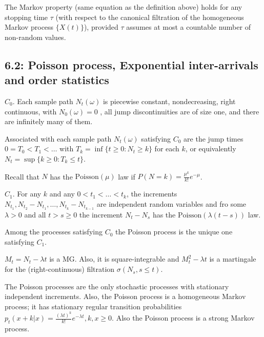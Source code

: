 \begin{proposition*} 
The Markov property (same equation as the definition above) holds for any
stopping time $\tau$ (with respect to the canonical filtration of the
homogeneous Markov process $\{X(t)\}$), provided $\tau$ assumes at most a
countable number of non-random values.
\end{proposition*} 







\subsection*{6.2: Poisson process, Exponential inter-arrivals and order statistics}

\begin{condition*}
$\boxed{C_0}$. Each sample path $N_t(\omega)$ is piecewise constant, nondecreasing, right continuous, with $N_0(\omega)=0$ , all jump discontinuities are of size one, and there are infinitely many of them.
\end{condition*}

Associated with each sample path $N_t(\omega)$ satisfying $\boxed{C_0}$ are the jump times $0=T_0<T_1<\dots$ with $T_k = \inf\{t \geq 0:N_t\geq k\}$ for each $k$, or equivalently $N_t = \sup\{k \geq 0 : T_k \leq t\}$. 

Recall that $N$ has the $\text{Poisson}(\mu)$ law if $P(N=k)=\frac{\mu^k}{k!}e^{-\mu}$.

\begin{condition*}
$\boxed{C_1}$. For any $k$ and any $0<t_1<\dots<t_k$, the increments $N_{t_1}, N_{t_2}-N_{t_1},\dots,N_{t_k}-N_{t_{k-1}}$ are independent random variables and fro some $\lambda > 0$ and all $t>s\geq0$ the increment $N_t-N_s$ has the $\text{Poisson}(\lambda(t-s))$ law.
\end{condition*}

\begin{definition*}
Among the processes satisfying $\boxed{C_0}$ the Poisson process is the unique one satisfying $\boxed{C_1}$.
\end{definition*}

\begin{corollary*}
$M_t = N_t - \lambda t$ is a MG. Also, it is square-integrable and $M_t^2 - \lambda t$ is a martingale for the (right-continuous) filtration $\sigma(N_s,s\leq t)$.
\end{corollary*}

\begin{proposition*}
The Poisson processes are the only stochastic processes with stationary independent increments. Also, the Poisson process is a homogeneous Markov process; it has stationary regular transition probabilities $p_t(x+k|x)=\frac{(\lambda t)^k}{k!} e^{-\lambda t}, k,x\geq 0$. Also the Poisson process is a strong Markov process.
\end{proposition*}

